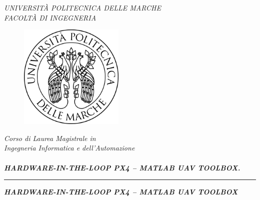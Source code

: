 \documentclass [a4paper,12pt]{report}
\begin{document}
\pagestyle{fancy}

\renewcommand{\chaptermark}[1]{\markboth{#1}{}}
\renewcommand{\sectionmark}[1]{\markright{\thesection\ #1}}
\fancyhf{} \fancyhead[LE,RO]{\bfseries\thepage}
\fancyhead[LO]{\bfseries\rightmark}
\fancyhead[RE]{\bfseries\leftmark}
\renewcommand{\headrulewidth}{0.5pt}
\renewcommand{\footrulewidth}{0pt}
\fancypagestyle{plain}{
\fancyhead{}
\renewcommand{\headrulewidth}{0pt}}

\thispagestyle{empty}

\begin{center}
    \large
    \textit{UNIVERSITÀ POLITECNICA DELLE MARCHE\\}
    \vspace*{.5cm}
  \textit{ FACOLTÀ DI INGEGNERIA \\}  
\end{center}

\begin{figure}[h]
    \centering
    \includegraphics[width=5cm]{files/logo.png}
\end{figure}

\begin{center}
  \vspace*{0.5cm} 
  \emph{Corso di Laurea Magistrale in\\Ingegneria Informatica e dell'Automazione\\}
	\hfill \\
  \vspace*{.75cm} \large %
  \emph{\textbf{HARDWARE-IN-THE-LOOP PX4 – MATLAB UAV TOOLBOX.}}
  \par
\noindent\rule{.3\textwidth}{1pt}\par\vspace{0.5cm}
\emph{\textbf{\textit{HARDWARE-IN-THE-LOOP PX4 – MATLAB UAV TOOLBOX}}}
\end{center}


\end{document}
